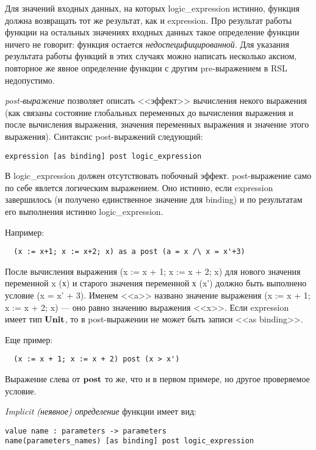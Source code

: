 \documentclass[14pt, twoside]{extreport}
\begin{document}
Для значений входных данных, на которых logic\_expression истинно, функция должна возвращать тот же результат, как и expression. Про результат работы функции на остальных значениях входных данных такое определение функции ничего не говорит: функция остается \emph{недоспецифицированной}. Для указания результата работы функций в этих случаях можно написать несколько аксиом, повторное же явное определение функции с другим pre-выражением в RSL недопустимо.

\emph{post-выражение} позволяет описать <<эффект>> вычисления некого выражения (как связаны состояние глобальных переменных до вычисления выражения и после вычисления выражения, значения переменных выражения и значение этого выражения). Синтаксис post-выражений следующий:
\begin{lstlisting}
expression [as binding] post logic_expression
\end{lstlisting}

В logic\_expression должен отсутствовать побочный эффект. post-выражение само по себе явлется логическим выражением. Оно истинно, если expression завершилось (и получено единственное значение для binding) и по результатам его выполнения истинно logic\_expression.

Например:
\begin{lstlisting}
  (x := x+1; x := x+2; x) as a post (a = x /\ x = x'+3)
\end{lstlisting}
После вычисления выражения (x := x + 1; x := x + 2; x) для нового значения переменной x (х) и старого значения переменной х (x') должно быть выполнено условие (x = x' + 3). Именем <<a>> названо значение выражения (x := x + 1; x := x + 2; x) --- оно равно значению выражения <<x>>. Если expression имеет тип $\textbf{Unit}$, то в post-выражении не может быть записи <<as binding>>.

Еще пример:
\begin{lstlisting}
  (x := x + 1; x := x + 2) post (x > x')
\end{lstlisting}
Выражение слева от $\mathop{\textbf{post}}$ то же, что и в первом примере, но другое проверяемое условие.


\emph{Implicit (неявное) определение} функции имеет вид:
\begin{lstlisting}
value name : parameters -> parameters
name(parameters_names) [as binding] post logic_expression
\end{lstlisting}
\end{document}
